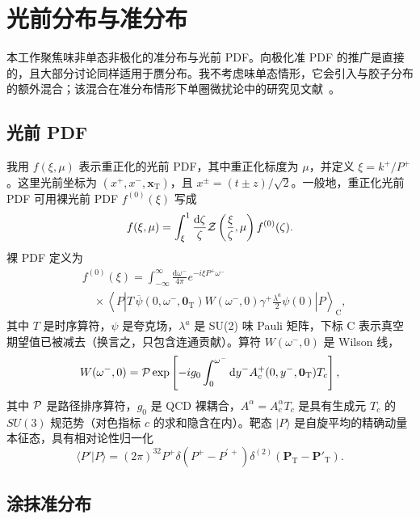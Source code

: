 \section{\label{sec:defns}光前分布与准分布}

本工作聚焦味非单态非极化的准分布与光前 PDF。向极化准 PDF 的推广是直接的，且大部分讨论同样适用于赝分布。我不考虑味单态情形，它会引入与胶子分布的额外混合；该混合在准分布情形下单圈微扰论中的研究见文献~\cite{Wang:2017qyg}。

\subsection{光前 PDF}

我用 $f(\xi,\mu)$ 表示重正化的光前 PDF，其中重正化标度为 $\mu$，并定义 $\xi=k^+/P^+$。这里光前坐标为 $(x^+,x^-,\boldsymbol{x}_\mathrm{T})$，且 $x^\pm = (t\pm z)/\sqrt{2}$。一般地，重正化光前 PDF 可用裸光前 PDF $f^{(0)}(\xi)$ 写成
\begin{equation}
f(\xi,\mu) = \int_\xi^1 \frac{\mathrm{d}\zeta}{\zeta}{\cal
Z}\left(\frac{\xi}{\zeta},\mu\right)f^{(0)}(\zeta).
\end{equation}
裸 PDF 定义为 \cite{Collins:2011zzd}
\begin{align}
 {} &f^{(0)}(\xi) = \int_{-\infty}^\infty
\frac{\mathrm{d}\omega^-}{4\pi}
e^{-i\xi P^+\omega^-} \nonumber\\
{} & \quad \times \left\langle P \left|
T\,\overline{\psi}(0,\omega^-,\mathbf{0}_\mathrm{T})
W(\omega^-,0)\gamma^+\frac{\lambda^a}{2}\psi(0) \right|
P\right\rangle_\mathrm{C},
\end{align}
其中 $T$ 是时序算符，$\psi$ 是夸克场，$\lambda^a$ 是 SU(2) 味 Pauli 矩阵，下标 C 表示真空期望值已被减去（换言之，只包含连通贡献）。算符 $W(\omega^-,0)$ 是 Wilson 线，
\begin{equation}
W(\omega^-,0) =
{\cal P}\exp\left[-ig_0\int_0^{\omega^-}\mathrm{d}y^-A^+_c(0,y^-,
\mathbf{0}_{\mathrm{T}})T_c\right],
\end{equation}
其中 ${\cal P}$ 是路径排序算符，$g_0$ 是 QCD 裸耦合，$A^\alpha = A^\alpha_c T_c$ 是具有生成元 $T_c$ 的 $SU(3)$ 规范势（对色指标 $c$ 的求和隐含在内）。靶态 $|P\rangle$ 是自旋平均的精确动量本征态，具有相对论性归一化
\begin{equation}
\langle P' | P \rangle =
(2\pi)^32P^+\delta\left(P^+-P^{\prime\,+}\right)\delta^{(2)}
\left(\mathbf{P}_\mathrm{T} - \mathbf{P}'_\mathrm{T}\right).
\end{equation}

\subsection{涂抹准分布}

